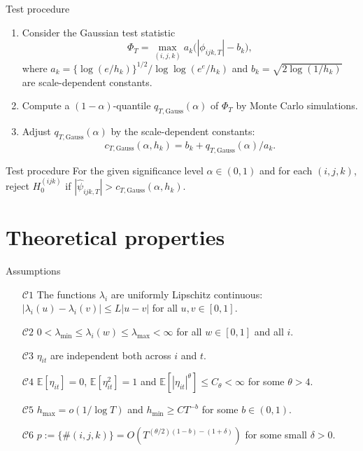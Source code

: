 \documentclass[10pt, handout]{beamer}
\newcommand{\E}{\mathbb{E}}
\begin{document}
\begin{frame}[label = frame_test]{Test procedure}

\begin{enumerate}
	\item Consider the Gaussian test statistic 
	\vspace{-2mm} \[ \Phi_T = \max_{(i,j,k)} a_k \big( |\phi_{ijk,T}| - b_k \big), \] where $a_k = \{\log(e/h_k)\}^{1/2} / \log \log(e^e / h_k)$ and $b_k = \sqrt{2 \log(1/h_k)}$ are scale-dependent constants.\pause
	\item Compute a $(1-\alpha)$-quantile $q_{T, \text{Gauss}} (\alpha)$ of $\Phi_T$ by Monte Carlo simulations.\pause
	\item Adjust $q_{T, \text{Gauss}} (\alpha)$ by the scale-dependent constants: \[c_{T,\text{Gauss}}(\alpha,h_k) = b_k + q_{T,\text{Gauss}}(\alpha)/a_k.\] \pause
\end{enumerate}
\vspace{-5mm}
\begin{block}{Test procedure}
For the given significance level $\alpha \in (0,1)$ and for each $(i,j,k)$, reject $H_0^{(ijk)}$ if $|\widehat{\psi}_{ijk,T}| > c_{T,\text{Gauss}}(\alpha,h_k)$.
\end{block}
\end{frame}

\section{Theoretical properties}
\begin{frame}{Assumptions}
\begin{itemize}
\item[$\mathcal{C}1$] \label{C1} The functions $\lambda_i$ are uniformly Lipschitz continuous: $|\lambda_i(u) - \lambda_i(v)| \le L |u-v|$ for all $u, v \in [0,1]$.
\item[$\mathcal{C}2$] \label{C2} $0 < \lambda_{\min} \le \lambda_i(w) \le \lambda_{\max} < \infty$ for all $w \in [0, 1]$ and all $i$. 
\item[$\mathcal{C}3$] \label{C3} $\eta_{it}$ are independent both across $i$ and $t$.
\item[$\mathcal{C}4$] \label{C4} $\E[\eta_{it}] = 0$, $\E[\eta_{it}^2] = 1$ and $\E[|\eta_{it}|^\theta] \le C_\theta < \infty$ for some $\theta > 4$. 
\item[$\mathcal{C}5$] \label{C5} $h_{\max} = o(1/\log T)$ and $h_{\min} \ge CT^{-b}$ for some $b \in (0,1)$.
\item[$\mathcal{C}6$] \label{C6} $p := \{ \# (i, j, k) \} = O(T^{(\theta/2)(1-b)-(1+\delta)})$ for some small $\delta > 0$.
\end{itemize}
\end{frame}
\end{document}
